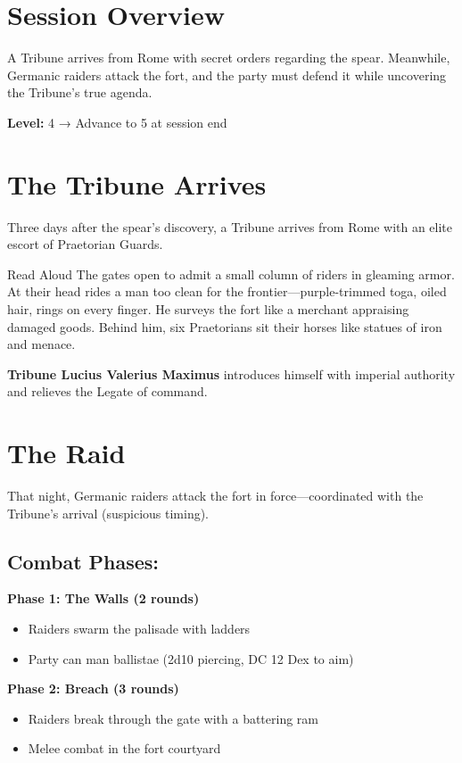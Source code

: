 \documentclass[letterpaper,oneside,twocolumn,openany]{dndbook}
\begin{document}
\section{Session Overview}
A Tribune arrives from Rome with secret orders regarding the spear. Meanwhile, Germanic raiders attack the fort, and the party must defend it while uncovering the Tribune's true agenda.

\textbf{Level:} 4 → Advance to 5 at session end

\section{The Tribune Arrives}

Three days after the spear's discovery, a Tribune arrives from Rome with an elite escort of Praetorian Guards.

\begin{paperbox}{Read Aloud}
The gates open to admit a small column of riders in gleaming armor. At their head rides a man too clean for the frontier—purple-trimmed toga, oiled hair, rings on every finger. He surveys the fort like a merchant appraising damaged goods. Behind him, six Praetorians sit their horses like statues of iron and menace.
\end{paperbox}

\textbf{Tribune Lucius Valerius Maximus} introduces himself with imperial authority and relieves the Legate of command.

\section{The Raid}

That night, Germanic raiders attack the fort in force—coordinated with the Tribune's arrival (suspicious timing).

\subsection{Combat Phases:}

\textbf{Phase 1: The Walls (2 rounds)}
\begin{itemize}
\item Raiders swarm the palisade with ladders
\item Party can man ballistae (2d10 piercing, DC 12 Dex to aim)
\end{itemize}

\textbf{Phase 2: Breach (3 rounds)}
\begin{itemize}
\item Raiders break through the gate with a battering ram
\item Melee combat in the fort courtyard
\end{itemize}
\end{document}
